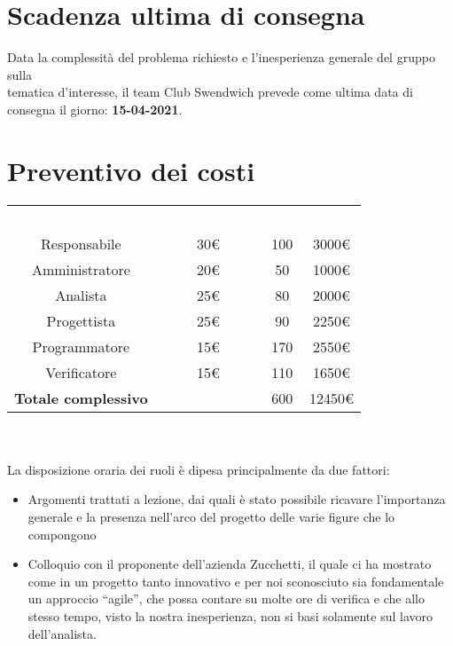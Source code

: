 \section{Scadenza ultima di consegna}
Data la complessità del problema richiesto e l'inesperienza generale del gruppo sulla \\
tematica d'interesse, il team Club Swendwich prevede come ultima data di consegna 
il giorno: \textbf{15-04-2021}.

\section{Preventivo dei costi}
{\renewcommand{\arraystretch}{1.5}
\begin{tabular}{cccc}
	\rowcolor[RGB]{33, 73, 50}
	\textcolor{white}{\textbf{Ruolo}} & \textcolor{white}{\textbf{Costo Orario}} 
    & \textcolor{white}{\textbf{Ore}} & \textcolor{white}{\textbf{Totale}}\\
	\rowcolor[RGB]{216, 235, 171}
	Responsabile & 30€ & 100 & 3000€     			\\
	\rowcolor[RGB]{233, 245, 206}
	Amministratore & 20€ & 50 & 1000€    			\\
    \rowcolor[RGB]{216, 235, 171}
	Analista & 25€ & 80 & 2000€          			\\
	\rowcolor[RGB]{233, 245, 206}
	Progettista & 25€ & 90 & 2250€       			\\
    \rowcolor[RGB]{216, 235, 171}
	Programmatore & 15€ & 170 & 2550€     			\\
	\rowcolor[RGB]{233, 245, 206}
	Verificatore & 15€ & 110 & 1650€      			\\
	\rowcolor[RGB]{216, 235, 171}
	\textbf{Totale complessivo} & & 600 & 12450€    \\
\end{tabular}	
}
\\\\
La disposizione oraria dei ruoli è dipesa principalmente da due fattori:
\begin{itemize}
	\item Argomenti trattati a lezione, dai quali è stato possibile ricavare l'importanza generale e la presenza nell'arco del progetto delle varie figure che lo compongono
	\item Colloquio con il proponente dell'azienda Zucchetti, il quale ci ha mostrato come in un progetto tanto innovativo e per noi sconosciuto sia fondamentale un approccio ``agile'', che possa contare su molte ore di verifica e che allo stesso tempo, visto la nostra inesperienza, non si basi solamente sul lavoro dell'analista.
\end{itemize}

